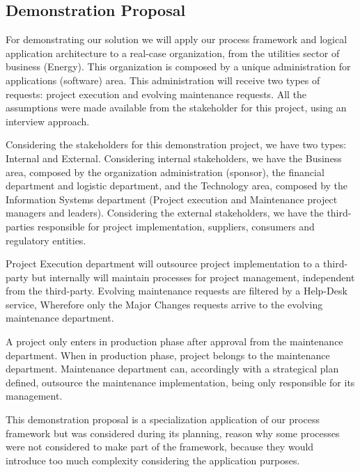 \subsection{Demonstration Proposal}

For demonstrating our solution we will apply our process framework and logical application architecture to a real-case organization, from the utilities sector of business (Energy). This organization is composed by a unique administration for applications (software) area. This administration will receive two types of requests: project execution and evolving maintenance requests. All the assumptions were made available from the stakeholder for this project, using an interview approach.\par
Considering the stakeholders for this demonstration project, we have two types: Internal and External. Considering internal stakeholders, we have the Business area, composed by the organization administration (sponsor), the financial department and logistic department, and the Technology area, composed by the Information Systems department (Project execution and Maintenance project managers and leaders). Considering the external stakeholders, we have the third-parties responsible for project implementation, suppliers, consumers and regulatory entities.\par
Project Execution department will outsource project implementation to a third-party but internally will maintain processes for project management, independent from the third-party. Evolving maintenance requests are filtered by a Help-Desk service, Wherefore only the Major Changes requests arrive to the evolving maintenance department.\par
A project only enters in production phase after approval from the maintenance department. When in production phase, project belongs to the maintenance department. Maintenance department can, accordingly with a strategical plan defined, outsource the maintenance implementation, being only responsible for its management.\par
This demonstration proposal is a specialization application of our process framework but was considered during its planning, reason why some processes were not considered to make part of the framework, because they would introduce too much complexity considering the application purposes.\par



